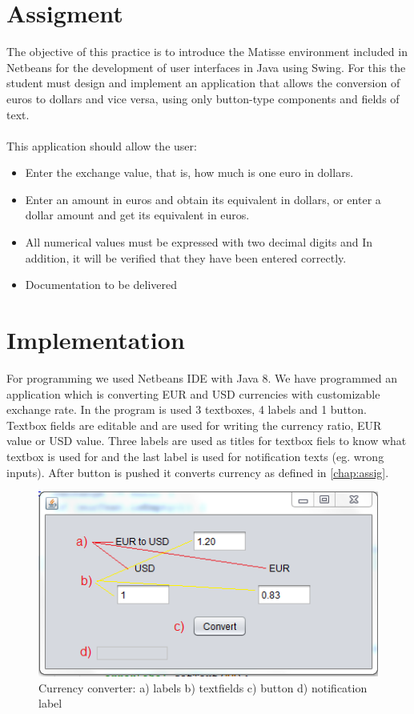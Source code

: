 \documentclass[12pt]{report}
\begin{document}
\chapter{Assigment}
\label{chap:assig}
The objective of this practice is to introduce the Matisse environment included in Netbeans for the development of user interfaces in Java using Swing. For this the student must design and implement an application that allows the conversion of euros to dollars and vice versa, using only button-type components and fields of text. 
\\ \\
This application should allow the user:
\begin{itemize}
\item Enter the exchange value, that is, how much is one euro in dollars.
\item Enter an amount in euros and obtain its equivalent in dollars, or
enter a dollar amount and get its equivalent in euros.
\item All numerical values must be expressed with two decimal digits and
In addition, it will be verified that they have been entered correctly.
\item Documentation to be delivered
\end{itemize}
%
%
\chapter{Implementation}
For programming we used Netbeans IDE with Java 8. We have programmed an application which is converting EUR and USD currencies with customizable exchange rate. In the program is used 3 textboxes, 4 labels and 1 button. Textbox fields are editable and are used for writing the currency ratio, EUR value or USD value. Three labels are used as titles for textbox fiels to know what textbox is used for and the last label is used for notification texts (eg. wrong inputs). After button is pushed it converts currency as defined in \autoref{chap:assig}. 

\begin{figure}[!ht]
\centering
\includegraphics[width=.8\linewidth]{img/gui.png}
\caption{Currency converter: a) labels b) textfields c) button d) notification label}
\label{fig:gui}
\end{figure}
\end{document}
